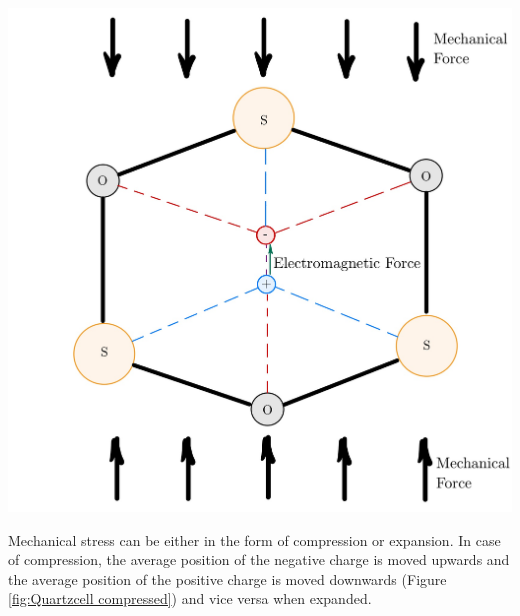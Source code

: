 \begin{minipage}{0.33\textwidth}
    \includegraphics[width=\textwidth]{./Figure_3.jpg}
    \label{fig:Quartzcell compressed}
\end{minipage}
\begin{minipage}{0.66\textwidth}
Mechanical stress can be either in the form of compression or expansion. In case of compression, the average position of the negative charge is moved upwards and the average position of the positive charge is moved downwards (Figure \ref{fig:Quartzcell compressed}) and vice versa when expanded.\cite{Mould2019}\\
\end{minipage}

